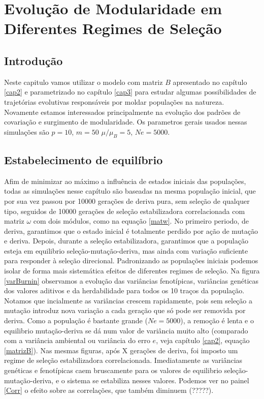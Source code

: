 \pagestyle{empty}
\cleardoublepage
\pagestyle{fancy}
\chapter{Evolução de Modularidade em Diferentes Regimes de
Seleção}\label{cap4}

\section{Introdução}

Neste capitulo vamos utilizar o modelo com matriz $B$ apresentado no
capítulo \ref{cap2} e parametrizado no capítulo \ref{cap3} para estudar
algumas possibilidades de trajetórias evolutivas responsáveis por moldar
populações na natureza. 
Novamente estamos interessados principalmente na evolução dos padrões de
covariação e surgimento de modularidade. 
Os parametros gerais usados nessas simulações são $p = 10$, $m = 50$
$\mu/\mu_B = 5$, $Ne = 5000$. 

\section{Estabelecimento de equilíbrio}

Afim de minimizar ao máximo a influência de estados iniciais das
populações, todas as simulações nesse capítulo são baseadas na mesma
população inicial, que por sua vez passou por 10000 gerações de deriva
pura, sem seleção de qualquer tipo, seguidos de 10000 gerações de
seleção estabilizadora correlacionada com matriz $\omega$ com dois
módulos, como na equação \ref{matw}. 
No primeiro periodo, de deriva, garantimos que o estado inicial é
totalmente perdido por ação de mutação e deriva. 
Depois, durante a seleção estabilizadora, garantimos que a população
esteja em equilibrio seleção-mutação-deriva, mas ainda com variação
suficiente para responder à seleção direcional. 
Padronizando as populações iniciais podemos isolar de forma mais
sistemática efeitos de diferentes regimes de seleção. 
Na figura \ref{varBurnin} observamos a evolução das variâncias
fenotípicas, variâncias genéticas dos valores aditivos e da
herdabilidade para todos os 10 traços da população. 
Notamos que incialmente as variâncias crescem rapidamente, pois sem
seleção a mutação introduz nova variação a cada geração que só pode ser
removida por deriva. 
Como a população é bastante grande ($Ne = 5000$), a remoção é lenta e o
equilibrio mutação-deriva se dá num valor de variância muito alto
(comparado com a variância ambiental ou variância do erro $e$, veja
capítulo \ref{cap2}, equação \ref{matrizB}). 
Nas mesmas figuras, após X gerações de deriva, foi imposto um regime de
seleção estabilizadora correlacionada. 
Imediatamente as variâncias genéticas e fenotípicas caem bruscamente
para os valores de equilibrio seleção-mutação-deriva, e o sistema se
estabiliza nesses valores. 
Podemos ver no painel \ref{Corr} o efeito sobre as correlações,
que também diminuem (?????). 

